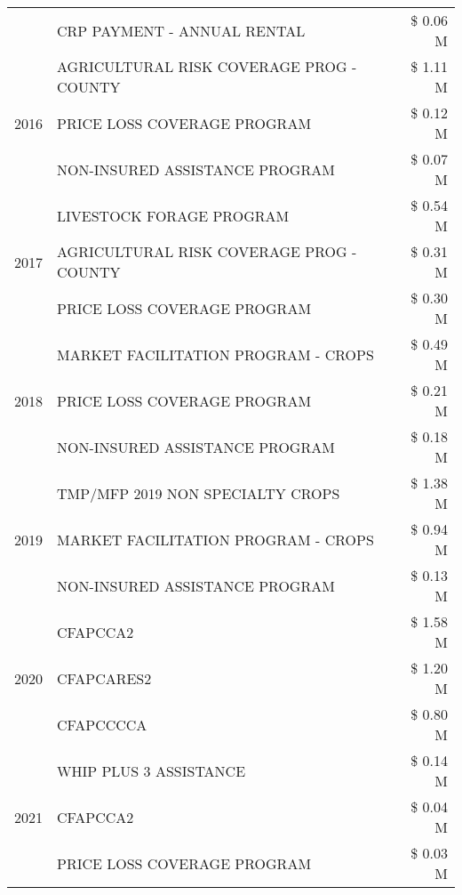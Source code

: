 \begin{tabular}{llr}
 & CRP PAYMENT - ANNUAL RENTAL & \$ 0.06 M \\
\cline{1-3}
\multirow[t]{3}{*}{2016} & AGRICULTURAL RISK COVERAGE PROG - COUNTY & \$ 1.11 M \\
 & PRICE LOSS COVERAGE PROGRAM & \$ 0.12 M \\
 & NON-INSURED ASSISTANCE PROGRAM & \$ 0.07 M \\
\cline{1-3}
\multirow[t]{3}{*}{2017} & LIVESTOCK FORAGE PROGRAM & \$ 0.54 M \\
 & AGRICULTURAL RISK COVERAGE PROG - COUNTY & \$ 0.31 M \\
 & PRICE LOSS COVERAGE PROGRAM & \$ 0.30 M \\
\cline{1-3}
\multirow[t]{3}{*}{2018} & MARKET FACILITATION PROGRAM - CROPS & \$ 0.49 M \\
 & PRICE LOSS COVERAGE PROGRAM & \$ 0.21 M \\
 & NON-INSURED ASSISTANCE PROGRAM & \$ 0.18 M \\
\cline{1-3}
\multirow[t]{3}{*}{2019} & TMP/MFP 2019 NON SPECIALTY CROPS & \$ 1.38 M \\
 & MARKET FACILITATION PROGRAM - CROPS & \$ 0.94 M \\
 & NON-INSURED ASSISTANCE PROGRAM & \$ 0.13 M \\
\cline{1-3}
\multirow[t]{3}{*}{2020} & CFAPCCA2 & \$ 1.58 M \\
 & CFAPCARES2 & \$ 1.20 M \\
 & CFAPCCCCA & \$ 0.80 M \\
\cline{1-3}
\multirow[t]{3}{*}{2021} & WHIP PLUS 3 ASSISTANCE & \$ 0.14 M \\
 & CFAPCCA2 & \$ 0.04 M \\
 & PRICE LOSS COVERAGE PROGRAM & \$ 0.03 M \\
\cline{1-3}
\bottomrule
\end{tabular}
